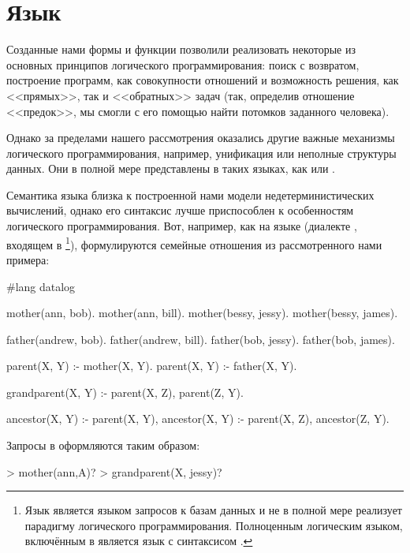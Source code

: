 \section[2]{Язык }%
Созданные нами формы и функции позволили реализовать некоторые из основных принципов логического программирования: поиск с возвратом, построение программ, как совокупности отношений и возможность решения, как <<прямых>>, так и <<обратных>> задач (так, определив отношение <<предок>>, мы смогли с его помощью найти потомков заданного человека). 

Однако за пределами нашего рассмотрения оказались другие важные механизмы логического программирования, например, унификация или неполные структуры данных. Они в полной мере представлены в таких языках, как  или .


Семантика языка  близка к построенной нами модели недетерминистических вычислений, однако его синтаксис лучше приспособлен к особенностям логического программирования. Вот, например, как на языке  (диалекте , входящем в \footnote{Язык  является языком запросов к базам данных и не в полной мере реализует парадигму логического программирования. Полноценным логическим языком, включённым в  является язык  с синтаксисом \Scheme.}), формулируются семейные отношения из рассмотренного нами примера:


\begin{Definition}
  #lang datalog

  mother(ann, bob).
  mother(ann, bill).
  mother(bessy, jessy).
  mother(bessy, james).

  father(andrew, bob).
  father(andrew, bill).
  father(bob, jessy).
  father(bob, james).

  parent(X, Y) :- mother(X, Y).
  parent(X, Y) :- father(X, Y).

  grandparent(X, Y) :- parent(X, Z), parent(Z, Y).

  ancestor(X, Y) :- parent(X, Y),
  ancestor(X, Y) :- parent(X, Z), ancestor(Z, Y).
\end{Definition}

Запросы в  оформляются таким образом:

\begin{SchemeCode}
  > mother(ann,A)?
  > grandparent(X, jessy)?
\end{SchemeCode}


